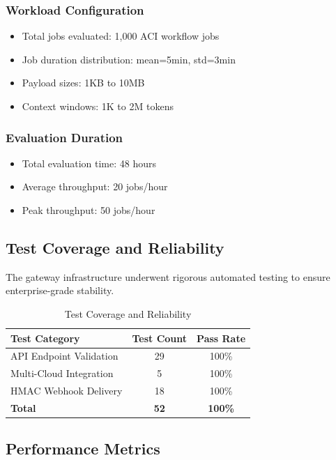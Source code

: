 \documentclass[10pt]{article}
\begin{document}
\subsubsection{Workload Configuration}
\begin{itemize}
    \item Total jobs evaluated: 1,000 ACI workflow jobs
    \item Job duration distribution: mean=5min, std=3min
    \item Payload sizes: 1KB to 10MB
    \item Context windows: 1K to 2M tokens
\end{itemize}

\subsubsection{Evaluation Duration}
\begin{itemize}
    \item Total evaluation time: 48 hours
    \item Average throughput: 20 jobs/hour
    \item Peak throughput: 50 jobs/hour
\end{itemize}

\subsection{Test Coverage and Reliability}

The gateway infrastructure underwent rigorous automated testing to ensure enterprise-grade stability.

\begin{table}[h]
\centering
\begin{tabular}{|l|c|c|}
\hline
\textbf{Test Category} & \textbf{Test Count} & \textbf{Pass Rate} \\
\hline
API Endpoint Validation & 29 & 100\% \\
Multi-Cloud Integration & 5 & 100\% \\
HMAC Webhook Delivery & 18 & 100\% \\
\textbf{Total} & \textbf{52} & \textbf{100\%} \\
\hline
\end{tabular}
\caption{Test Coverage and Reliability}
\end{table}

\subsection{Performance Metrics}
\end{document}
